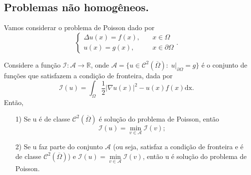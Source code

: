 \documentclass[../pde_notes.tex]{subfiles}
\begin{document}
\subsection{Problemas não homogêneos.}
Vamos considerar o problema de Poisson dado por
\[
	\left\{\begin{array}{ll}
		\Delta  u(x) = f(x), & \quad x\in \Omega          \\
		u(x) = g(x),         & \quad x\in \partial \Omega
	\end{array}\right..
\]
\begin{theorem*}
	Considere a função \(\mathcal{I}:\mathcal{A}\rightarrow \mathbb{R}\), onde \(\mathcal{A} = \{u\in \mathcal{C}^{2}(\overline{\Omega }):\; u|_{\partial \Omega } = g\}\) é o conjunto de funções que satisfazem a condição de fronteira, dada por
	\[
		\mathcal{I}(u) = \int_{\Omega }^{}\frac{1}{2}|\nabla u(x)|^{2} - u(x)f(x) \mathrm{dx}.
	\]
	Então,
	\begin{itemize}
		\item[1)] Se u é de classe \(\mathcal{C}^{2}(\overline{\Omega })\) é solução do problema de Poisson, então
		      \[
			      \mathcal{I}(u) = \min\limits_{v\in \mathcal{A}}\mathcal{I}(v);
		      \]
		\item[2)] Se u faz parte do conjunto \(\mathcal{A}\) (ou seja, satisfaz a condição de fronteira e é de classe \(\mathcal{C}^{2}(\overline{\Omega })\)) e \(\mathcal{I}(u) = \min\limits_{v\in \mathcal{A}}\mathcal{I}(v)\), então u é solução do problema de Poisson.
	\end{itemize}
\end{theorem*}
\end{document}
